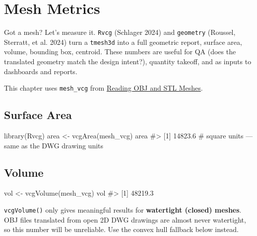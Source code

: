 \documentclass[
  11pt,
  letterpaper,
  DIV=11,
  numbers=noendperiod]{scrreprt}
\newenvironment{Shaded}{\begin{snugshade}}{\end{snugshade}}
\newcommand{\CommentTok}[1]{\textcolor[rgb]{0.37,0.37,0.37}{#1}}
\newcommand{\FunctionTok}[1]{\textcolor[rgb]{0.28,0.35,0.67}{#1}}
\newcommand{\NormalTok}[1]{\textcolor[rgb]{0.00,0.23,0.31}{#1}}
\newcommand{\OtherTok}[1]{\textcolor[rgb]{0.00,0.23,0.31}{#1}}
\begin{document}
\chapter{Mesh Metrics}\label{mesh-metrics}

Got a mesh? Let's measure it. \texttt{Rvcg} (Schlager 2024) and
\texttt{geometry} (Roussel, Sterratt, et al. 2024) turn a
\texttt{tmesh3d} into a full geometric report, surface area, volume,
bounding box, centroid. These numbers are useful for QA (does the
translated geometry match the design intent?), quantity takeoff, and as
inputs to dashboards and reports.

This chapter uses \texttt{mesh\_vcg} from
\hyperref[reading-obj-and-stl-meshes]{Reading OBJ and STL Meshes}.

\section{Surface Area}\label{surface-area}

\begin{Shaded}
\begin{Highlighting}[]
\FunctionTok{library}\NormalTok{(Rvcg)}
\NormalTok{area }\OtherTok{\textless{}{-}} \FunctionTok{vcgArea}\NormalTok{(mesh\_vcg)}
\NormalTok{area}
\CommentTok{\#\textgreater{} [1] 14823.6   \# square units — same as the DWG drawing units}
\end{Highlighting}
\end{Shaded}

\section{Volume}\label{volume}

\begin{Shaded}
\begin{Highlighting}[]
\NormalTok{vol }\OtherTok{\textless{}{-}} \FunctionTok{vcgVolume}\NormalTok{(mesh\_vcg)}
\NormalTok{vol}
\CommentTok{\#\textgreater{} [1] 48219.3}
\end{Highlighting}
\end{Shaded}

\begin{tcolorbox}[enhanced jigsaw, titlerule=0mm, colback=white, colframe=quarto-callout-warning-color-frame, bottomtitle=1mm, bottomrule=.15mm, coltitle=black, arc=.35mm, left=2mm, title=\textcolor{quarto-callout-warning-color}{\faExclamationTriangle}\hspace{0.5em}{Warning}, colbacktitle=quarto-callout-warning-color!10!white, toptitle=1mm, breakable, toprule=.15mm, rightrule=.15mm, leftrule=.75mm, opacitybacktitle=0.6, opacityback=0]

\texttt{vcgVolume()} only gives meaningful results for
\textbf{watertight (closed) meshes}. OBJ files translated from open 2D
DWG drawings are almost never watertight, so this number will be
unreliable. Use the convex hull fallback below instead.

\end{tcolorbox}
\end{document}
